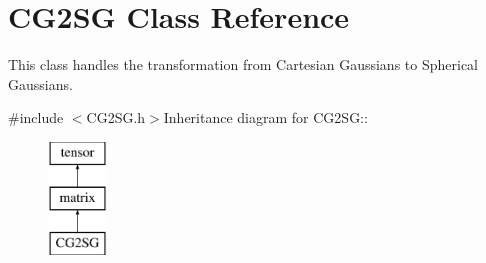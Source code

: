\hypertarget{classJKBuilder_1_1CG2SG}{
\section{CG2SG Class Reference}
\label{classJKBuilder_1_1CG2SG}
}


This class handles the transformation from Cartesian Gaussians to Spherical Gaussians.  


{\ttfamily \#include $<$CG2SG.h$>$}Inheritance diagram for CG2SG::\begin{figure}[H]
\begin{center}
\leavevmode
\includegraphics[height=3cm]{classJKBuilder_1_1CG2SG}
\end{center}
\end{figure}

